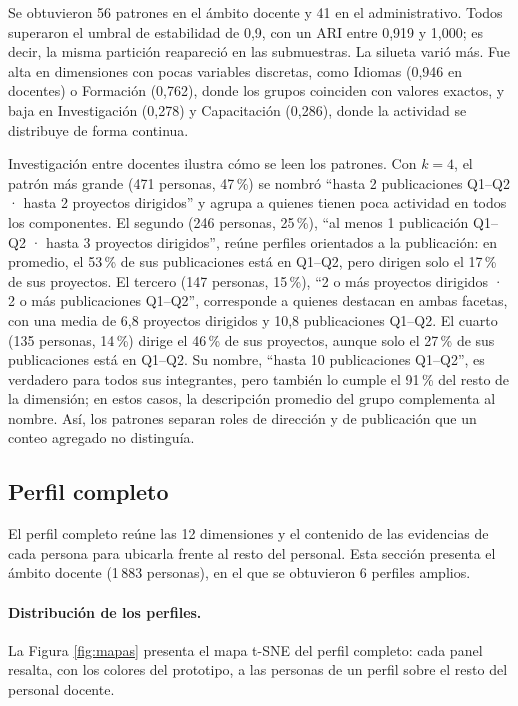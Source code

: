 Se obtuvieron 56 patrones en el ámbito docente y 41 en el administrativo. Todos superaron el umbral de estabilidad de 0,9, con un ARI entre 0,919 y 1,000; es decir, la misma partición reapareció en las submuestras. La silueta varió más. Fue alta en dimensiones con pocas variables discretas, como Idiomas (0,946 en docentes) o Formación (0,762), donde los grupos coinciden con valores exactos, y baja en Investigación (0,278) y Capacitación (0,286), donde la actividad se distribuye de forma continua.

Investigación entre docentes ilustra cómo se leen los patrones. Con $k = 4$, el patrón más grande (471 personas, 47\,\%) se nombró ``hasta 2 publicaciones Q1--Q2 · hasta 2 proyectos dirigidos'' y agrupa a quienes tienen poca actividad en todos los componentes. El segundo (246 personas, 25\,\%), ``al menos 1 publicación Q1--Q2 · hasta 3 proyectos dirigidos'', reúne perfiles orientados a la publicación: en promedio, el 53\,\% de sus publicaciones está en Q1--Q2, pero dirigen solo el 17\,\% de sus proyectos. El tercero (147 personas, 15\,\%), ``2 o más proyectos dirigidos · 2 o más publicaciones Q1--Q2'', corresponde a quienes destacan en ambas facetas, con una media de 6,8 proyectos dirigidos y 10,8 publicaciones Q1--Q2. El cuarto (135 personas, 14\,\%) dirige el 46\,\% de sus proyectos, aunque solo el 27\,\% de sus publicaciones está en Q1--Q2. Su nombre, ``hasta 10 publicaciones Q1--Q2'', es verdadero para todos sus integrantes, pero también lo cumple el 91\,\% del resto de la dimensión; en estos casos, la descripción promedio del grupo complementa al nombre. Así, los patrones separan roles de dirección y de publicación que un conteo agregado no distinguía.
\fi

\subsection{Perfil completo}
\label{sec:res_perfil_completo}

El perfil completo reúne las 12 dimensiones y el contenido de las evidencias de cada persona para ubicarla frente al resto del personal. Esta sección presenta el ámbito docente (1\,883 personas), en el que se obtuvieron 6 perfiles amplios.

\paragraph{Distribución de los perfiles.}
La Figura \ref{fig:mapas} presenta el mapa t-SNE del perfil completo: cada panel resalta, con los colores del prototipo, a las personas de un perfil sobre el resto del personal docente.

